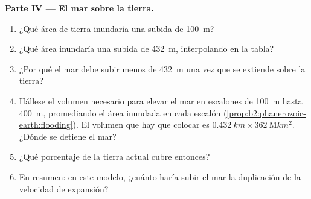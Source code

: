 \begin{problem}
\noindent\textbf{Parte IV --- El mar sobre la tierra.}
\begin{enumerate}[resume]
  \item ¿Qué área de tierra inundaría una subida de \qty{100}{m}?
  \item ¿Qué área inundaría una subida de \qty{432}{m}, interpolando en la tabla?
  \item ¿Por qué el mar debe subir menos de \qty{432}{m} una vez que se extiende sobre la tierra?
  \item Hállese el volumen necesario para elevar el mar en escalones de \qty{100}{m} hasta \qty{400}{m},
        promediando el área inundada en cada escalón (\cref{prop:b2:phanerozoic-earth:flooding}).
        El volumen que hay que colocar es $\qty{0.432}{km} \times \qty{362}{\mega km^2}$. ¿Dónde se
        detiene el mar?
  \item ¿Qué porcentaje de la tierra actual cubre entonces?
  \item En resumen: en este modelo, ¿cuánto haría subir el mar la duplicación de la velocidad de expansión?
\end{enumerate}
\end{problem}
